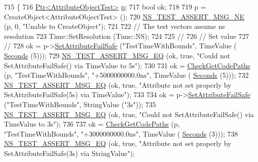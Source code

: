 \begin{DoxyCode}
715 \{
716   \hyperlink{classns3_1_1Ptr}{Ptr<AttributeObjectTest>} \hyperlink{lte__link__budget_8m_ac9de518908a968428863f829398a4e62}{p};
717   \textcolor{keywordtype}{bool} ok;
718 
719   p = CreateObject<AttributeObjectTest> ();
720   \hyperlink{group__testing_ga73d66fb0050a5111453fd144e767b91a}{NS\_TEST\_ASSERT\_MSG\_NE} (p, 0, \textcolor{stringliteral}{"Unable to CreateObject"});
721 
722   \textcolor{comment}{// The test vectors assume ns resolution}
723   Time::SetResolution (Time::NS);
724   
725   \textcolor{comment}{//}
726   \textcolor{comment}{// Set value}
727   \textcolor{comment}{//}
728   ok = p->\hyperlink{classns3_1_1ObjectBase_aa7d333004e970f925a4ed5df275541b5}{SetAttributeFailSafe} (\textcolor{stringliteral}{"TestTimeWithBounds"}, TimeValue (
      \hyperlink{group__timecivil_ga33c34b816f8ff6628e33d5c8e9713b9e}{Seconds} (5)));
729   \hyperlink{group__testing_ga2a9d78cffb3db8e867c35fff0b698cf5}{NS\_TEST\_ASSERT\_MSG\_EQ} (ok, \textcolor{keyword}{true}, \textcolor{stringliteral}{"Could not SetAttributeFailSafe() via TimeValue to
       5s"});
730 
731   ok = \hyperlink{classAttributeTestCase_a902fb84c803f1c898329f9263575331e}{CheckGetCodePaths} (p, \textcolor{stringliteral}{"TestTimeWithBounds"}, \textcolor{stringliteral}{"+5000000000.0ns"}, TimeValue (
      \hyperlink{group__timecivil_ga33c34b816f8ff6628e33d5c8e9713b9e}{Seconds} (5)));
732   \hyperlink{group__testing_ga2a9d78cffb3db8e867c35fff0b698cf5}{NS\_TEST\_ASSERT\_MSG\_EQ} (ok, \textcolor{keyword}{true}, \textcolor{stringliteral}{"Attribute not set properly by
       SetAttributeFailSafe(5s) via TimeValue"});
733 
734   ok = p->\hyperlink{classns3_1_1ObjectBase_aa7d333004e970f925a4ed5df275541b5}{SetAttributeFailSafe} (\textcolor{stringliteral}{"TestTimeWithBounds"}, StringValue (\textcolor{stringliteral}{"3s"}));
735   \hyperlink{group__testing_ga2a9d78cffb3db8e867c35fff0b698cf5}{NS\_TEST\_ASSERT\_MSG\_EQ} (ok, \textcolor{keyword}{true}, \textcolor{stringliteral}{"Could not SetAttributeFailSafe() via TimeValue to
       3s"});
736 
737   ok = \hyperlink{classAttributeTestCase_a902fb84c803f1c898329f9263575331e}{CheckGetCodePaths} (p, \textcolor{stringliteral}{"TestTimeWithBounds"}, \textcolor{stringliteral}{"+3000000000.0ns"}, TimeValue (
      \hyperlink{group__timecivil_ga33c34b816f8ff6628e33d5c8e9713b9e}{Seconds} (3)));
738   \hyperlink{group__testing_ga2a9d78cffb3db8e867c35fff0b698cf5}{NS\_TEST\_ASSERT\_MSG\_EQ} (ok, \textcolor{keyword}{true}, \textcolor{stringliteral}{"Attribute not set properly by
       SetAttributeFailSafe(3s) via StringValue"});

\end{DoxyCode}
